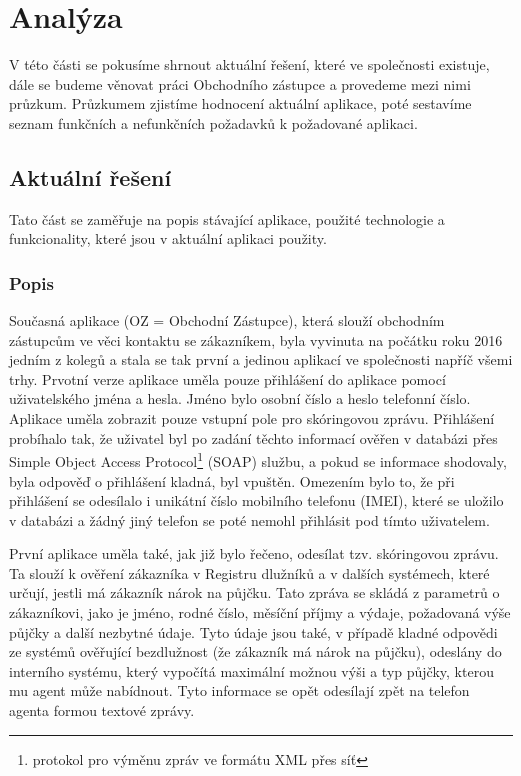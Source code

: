 \documentclass[11pt,twoside,a4paper]{book}
\begin{document}
\chapter{Analýza}
V této části se pokusíme shrnout aktuální řešení, které ve společnosti existuje, dále se budeme věnovat práci Obchodního zástupce a provedeme mezi nimi průzkum. Průzkumem zjistíme hodnocení aktuální aplikace, poté sestavíme seznam funkčních a nefunkčních požadavků k požadované aplikaci. 

\section{Aktuální řešení}
Tato část se zaměřuje na popis stávající aplikace, použité technologie a funkcionality, které jsou v aktuální aplikaci použity. 

\subsection{Popis}
Současná aplikace  (OZ = Obchodní Zástupce), která slouží obchodním zástupcům ve věci kontaktu se zákazníkem, byla vyvinuta na počátku roku 2016 jedním z kolegů a stala se tak první a jedinou aplikací ve společnosti napříč všemi trhy. Prvotní verze aplikace uměla pouze přihlášení do aplikace pomocí uživatelského jména a hesla. Jméno bylo osobní číslo a heslo telefonní číslo. Aplikace uměla zobrazit pouze vstupní pole pro skóringovou zprávu. Přihlášení probíhalo tak, že uživatel byl po zadání těchto informací ověřen v databázi přes Simple Object Access Protocol\footnote{protokol pro výměnu zpráv ve formátu XML přes síť} (SOAP) službu, a pokud se informace shodovaly, byla odpověď o přihlášení kladná, byl vpuštěn. Omezením bylo to, že při přihlášení se odesílalo i unikátní číslo mobilního telefonu (IMEI), které se uložilo v databázi a žádný jiný telefon se poté nemohl přihlásit pod tímto uživatelem.

První aplikace uměla také, jak již bylo řečeno, odesílat tzv. skóringovou zprávu. Ta slouží k ověření zákazníka v Registru dlužníků a v dalších systémech, které určují, jestli má zákazník nárok na půjčku. Tato zpráva se skládá z parametrů o zákazníkovi, jako je jméno, rodné číslo, měsíční příjmy a výdaje, požadovaná výše půjčky a další nezbytné údaje. Tyto údaje jsou také, v případě kladné odpovědi ze systémů ověřující bezdlužnost (že zákazník má nárok na půjčku), odeslány do interního systému, který vypočítá maximální možnou výši a typ půjčky, kterou mu agent může nabídnout. Tyto informace se opět odesílají zpět na telefon agenta formou textové zprávy. 
\end{document}
